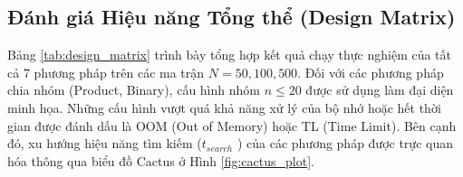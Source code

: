 \documentclass[a4paper,fleqn,numbers]{cas-sc}
\begin{document}
    \subsection{Đánh giá Hiệu năng Tổng thể (Design Matrix)}\label{subsec:full_eval}
    Bảng \ref{tab:design_matrix} trình bày tổng hợp kết quả chạy thực nghiệm của tất cả 7 phương pháp trên các ma trận
    $N = 50, 100, 500$. Đối với các phương pháp chia nhóm (Product, Binary), cấu hình nhóm $n \le 20$
    được sử dụng làm đại diện minh họa. Những cấu hình vượt quá khả năng xử lý của bộ nhớ hoặc hết thời gian được đánh
    dấu là OOM (Out of Memory) hoặc TL (Time Limit).
    Bên cạnh đó, xu hướng hiệu năng tìm kiếm ($t_{search}$
    ) của các phương pháp được trực quan hóa thông qua biểu đồ Cactus ở Hình \ref{fig:cactus_plot}.


    \begin{table}[H]
        \centering
        \caption{Ma trận thiết kế (Design Matrix) so sánh các phương pháp mã hóa SAT và Exact Solvers\cite{ref_3}}
        \resizebox{\textwidth}{!}{


}
\end{table}
\end{document}
